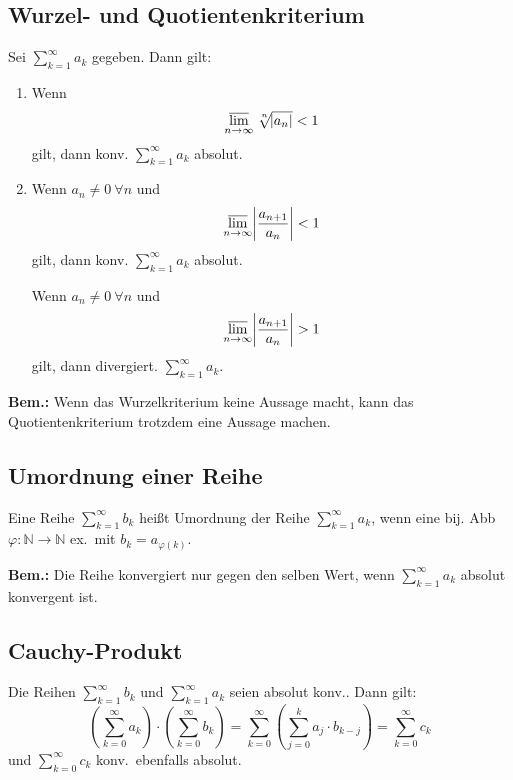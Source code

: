 \documentclass[10pt]{article}
\newcommand{\N}{\mathbb{N}}
\newcommand*{\nthSqrt}[2]{\sqrt[\leftroot{-2}\uproot{2}#1]{#2}}
\begin{document}
    \subsection{Wurzel- und Quotientenkriterium}
    Sei $\sum_{k=1}^\infty a_k$ gegeben. Dann gilt:
    \begin{enumerate}[label= (\alph*)]
        \item Wenn
            \begin{equation*}
                \varlimsup_{n \rightarrow \infty}
                \nthSqrt{n}{\abs{a_n}} < 1
            \end{equation*}
            gilt, dann konv. $\sum_{k=1}^\infty a_k$ absolut.
        \item Wenn $a_n \neq 0\ \forall n$ und
            \begin{equation*}
                \varlimsup_{n \rightarrow \infty}
                \abs{\frac{a_{n+1}}{a_n}} < 1
            \end{equation*}
            gilt, dann konv. $\sum_{k=1}^\infty a_k$ absolut.

            Wenn $a_n \neq 0\ \forall n$ und
            \begin{equation*}
                \varlimsup_{n \rightarrow \infty}
                \abs{\frac{a_{n+1}}{a_n}} > 1
            \end{equation*}
            gilt, dann divergiert. $\sum_{k=1}^\infty a_k$.
    \end{enumerate}
    \textbf{Bem.:} Wenn das Wurzelkriterium keine Aussage macht, kann das
    Quotientenkriterium trotzdem eine Aussage machen.

    \subsection{Umordnung einer Reihe}
    Eine Reihe $\sum_{k=1}^\infty b_k$ heißt Umordnung der Reihe
    $\sum_{k=1}^\infty a_k$,
    wenn eine bij. Abb $\varphi: \N \rightarrow \N$ ex.\ mit $b_k = a_{\varphi(k)}$.

    \textbf{Bem.:}
    Die Reihe konvergiert nur gegen den selben Wert, wenn $\sum_{k=1}^\infty a_k$
    absolut konvergent ist.

    \subsection{Cauchy-Produkt}
    Die Reihen  $\sum_{k=1}^\infty b_k$ und $\sum_{k=1}^\infty a_k$ seien absolut
    konv.. Dann gilt:
    \begin{equation*}
        \left(\sum_{k=0}^\infty a_k\right) \cdot \left(\sum_{k=0}^\infty b_k\right) =
        \sum_{k=0}^\infty \left(\sum_{j=0}^k a_j \cdot b_{k-j}\right) =
        \sum_{k=0}^\infty c_k
    \end{equation*}
    und $\sum_{k=0}^\infty c_k$ konv.\ ebenfalls absolut.
\end{document}
